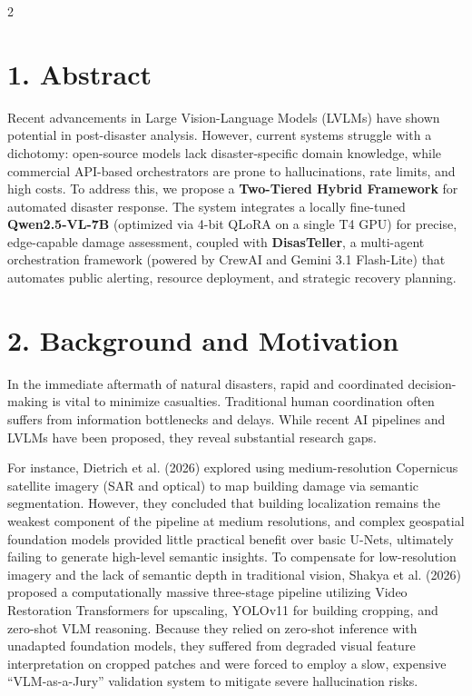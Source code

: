 \documentclass[11pt]{article}
\begin{document}
\begin{multicols}{2}

\section*{1. Abstract}
Recent advancements in Large Vision-Language Models (LVLMs) have shown potential in post-disaster analysis. However, current systems struggle with a dichotomy: open-source models lack disaster-specific domain knowledge, while commercial API-based orchestrators are prone to hallucinations, rate limits, and high costs. To address this, we propose a \textbf{Two-Tiered Hybrid Framework} for automated disaster response. The system integrates a locally fine-tuned \textbf{Qwen2.5-VL-7B} (optimized via 4-bit QLoRA on a single T4 GPU) for precise, edge-capable damage assessment, coupled with \textbf{DisasTeller}, a multi-agent orchestration framework (powered by CrewAI and Gemini 3.1 Flash-Lite) that automates public alerting, resource deployment, and strategic recovery planning.

\section*{2. Background and Motivation}
In the immediate aftermath of natural disasters, rapid and coordinated decision-making is vital to minimize casualties. Traditional human coordination often suffers from information bottlenecks and delays. While recent AI pipelines and LVLMs have been proposed, they reveal substantial research gaps. 

For instance, Dietrich et al. (2026) explored using medium-resolution Copernicus satellite imagery (SAR and optical) to map building damage via semantic segmentation. However, they concluded that building localization remains the weakest component of the pipeline at medium resolutions, and complex geospatial foundation models provided little practical benefit over basic U-Nets, ultimately failing to generate high-level semantic insights. To compensate for low-resolution imagery and the lack of semantic depth in traditional vision, Shakya et al. (2026) proposed a computationally massive three-stage pipeline utilizing Video Restoration Transformers for upscaling, YOLOv11 for building cropping, and zero-shot VLM reasoning. Because they relied on zero-shot inference with unadapted foundation models, they suffered from degraded visual feature interpretation on cropped patches and were forced to employ a slow, expensive ``VLM-as-a-Jury'' validation system to mitigate severe hallucination risks.


\end{multicols}
\end{document}
